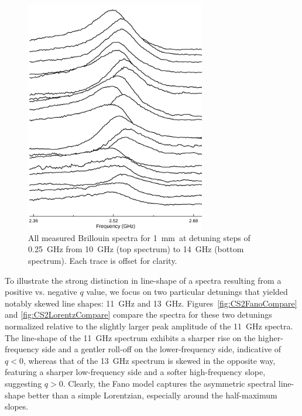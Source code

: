 \begin{figure}[ht]
  \centering
  \includegraphics[width=0.7\textwidth]{figs/4-CABS/JoyDivisionCABSCS2.pdf}
  \caption{All measured Brillouin spectra for \SI{1}{\milli\meter}\, at detuning steps of \SI{0.25}{\giga\hertz} from \SI{10}{\giga\hertz} (top spectrum) to \SI{14}{\giga\hertz} (bottom spectrum). Each trace is offset for clarity.}
  \label{fig:Joy Division CS2}
\end{figure}

\FloatBarrier

To illustrate the strong distinction in line-shape of a spectra resulting from a positive vs. negative \(q\) value, we focus on two particular detunings that yielded notably skewed line shapes: \SI{11}{\giga\hertz} and \SI{13}{\giga\hertz}. Figures~\ref{fig:CS2FanoCompare} and \ref{fig:CS2LorentzCompare} compare the spectra for these two detunings normalized relative to the slightly larger peak amplitude of the \SI{11}{\giga\hertz} spectra. The line-shape of the \SI{11}{\giga\hertz} spectrum exhibits a sharper rise on the higher-frequency side and a gentler roll-off on the lower-frequency side, indicative of \(q<0\), whereas that of the \SI{13}{\giga\hertz} spectrum is skewed in the opposite way, featuring a sharper low-frequency side and a softer high-frequency slope, suggesting \(q>0\). Clearly, the Fano model captures the asymmetric spectral line-shape better than a simple Lorentzian, especially around the half-maximum slopes.

